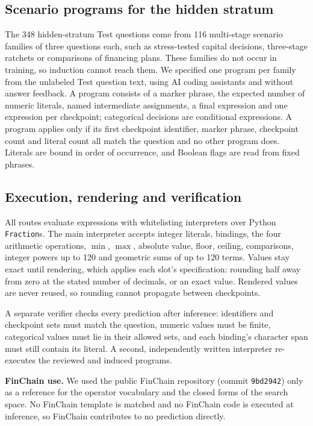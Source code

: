\documentclass[conference]{IEEEtran}
\begin{document}
\subsection{Scenario programs for the hidden stratum}
The 348 hidden-stratum Test questions come from 116 multi-stage scenario families of three questions each, such as stress-tested capital decisions, three-stage ratchets or comparisons of financing plans. These families do not occur in training, so induction cannot reach them. We specified one program per family from the unlabeled Test question text, using AI coding assistants and without answer feedback. A program consists of a marker phrase, the expected number of numeric literals, named intermediate assignments, a final expression and one expression per checkpoint; categorical decisions are conditional expressions. A program applies only if its first checkpoint identifier, marker phrase, checkpoint count and literal count all match the question and no other program does. Literals are bound in order of occurrence, and Boolean flags are read from fixed phrases.

\subsection{Execution, rendering and verification}
All routes evaluate expressions with whitelisting interpreters over Python \texttt{Fraction}s. The main interpreter accepts integer literals, bindings, the four arithmetic operations, $\min$, $\max$, absolute value, floor, ceiling, comparisons, integer powers up to 120 and geometric sums of up to 120 terms. Values stay exact until rendering, which applies each slot's specification: rounding half away from zero at the stated number of decimals, or an exact value. Rendered values are never reused, so rounding cannot propagate between checkpoints.

A separate verifier checks every prediction after inference: identifiers and checkpoint sets must match the question, numeric values must be finite, categorical values must lie in their allowed sets, and each binding's character span must still contain its literal. A second, independently written interpreter re-executes the reviewed and induced programs.

\textbf{FinChain use.} We used the public FinChain repository (commit \texttt{9bd2942}) only as a reference for the operator vocabulary and the closed forms of the search space. No FinChain template is matched and no FinChain code is executed at inference, so FinChain contributes to no prediction directly.
\end{document}
